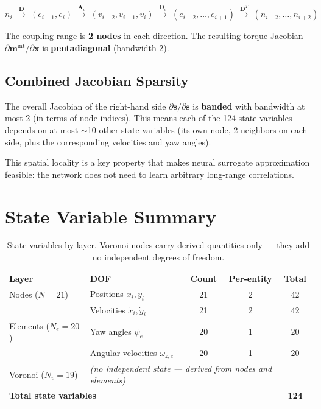 \documentclass[11pt]{article}
\newcommand{\vect}[1]{\mathbf{#1}}
\newcommand{\mat}[1]{\mathbf{#1}}
\begin{document}
\begin{equation}
  n_i \;\xrightarrow{\mat{D}}\; (e_{i-1}, e_i)
    \;\xrightarrow{\mat{A}_v}\; (v_{i-2}, v_{i-1}, v_i)
    \;\xrightarrow{\mat{D}_v}\; (e_{i-2}, \ldots, e_{i+1})
    \;\xrightarrow{\mat{D}^T}\; (n_{i-2}, \ldots, n_{i+2})
\end{equation}

\noindent
The coupling range is \textbf{2 nodes} in each direction.
The resulting torque Jacobian $\partial \vect{m}^{\text{int}} / \partial \vect{x}$ is \textbf{pentadiagonal} (bandwidth 2).

\subsection{Combined Jacobian Sparsity}

The overall Jacobian of the right-hand side $\partial\dot{\vect{s}}/\partial\vect{s}$ is \textbf{banded} with bandwidth at most 2 (in terms of node indices).
This means each of the 124 state variables depends on at most $\sim$10 other state variables (its own node, 2 neighbors on each side, plus the corresponding velocities and yaw angles).

This spatial locality is a key property that makes neural surrogate approximation feasible: the network does not need to learn arbitrary long-range correlations.

\section{State Variable Summary}

\begin{table}[H]
  \centering
  \renewcommand{\arraystretch}{1.3}
  \begin{tabular}{llccc}
    \toprule
    Layer & DOF & Count & Per-entity & Total \\
    \midrule
    Nodes ($N = 21$) & Positions $x_i, y_i$ & 21 & 2 & 42 \\
                      & Velocities $\dot{x}_i, \dot{y}_i$ & 21 & 2 & 42 \\
    \midrule
    Elements ($N_e = 20$) & Yaw angles $\psi_e$ & 20 & 1 & 20 \\
                           & Angular velocities $\omega_{z,e}$ & 20 & 1 & 20 \\
    \midrule
    Voronoi ($N_v = 19$) & \multicolumn{4}{l}{\textit{(no independent state --- derived from nodes and elements)}} \\
    \midrule
    \multicolumn{4}{l}{\textbf{Total state variables}} & \textbf{124} \\
    \bottomrule
  \end{tabular}
  \caption{State variables by layer.  Voronoi nodes carry derived quantities only --- they add no independent degrees of freedom.}
  \label{tab:state-summary}
\end{table}

\end{document}
